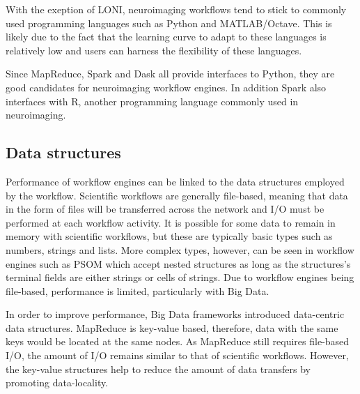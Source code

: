             With the exeption of LONI, neuroimaging workflows tend to stick to
            commonly used programming languages such as Python and MATLAB/Octave.
            This is likely due to the fact that the learning curve to adapt to
            these languages is relatively low and users can harness the 
            flexibility of these languages. 
            
            Since MapReduce, Spark and Dask all provide interfaces to Python,  
            they are good candidates for neuroimaging workflow engines. In addition
            Spark also interfaces with R, another programming language commonly
            used in neuroimaging.

            \subsection{Data structures}\label{ds}
                
                Performance of workflow engines can be linked to the data structures
                employed by the workflow. Scientific
                workflows are generally file-based, meaning that data in the 
                form of files will be 
                transferred across the network and I/O must be
                performed at each workflow activity. It is possible for some 
                data to remain in memory with scientific workflows, but these 
                are typically basic types such as numbers, strings and lists.
                More complex types, however, can be seen in workflow engines 
                such as PSOM which accept nested structures as long as the
                structures's terminal fields are either strings or cells of 
                strings. Due to workflow engines being file-based, performance
                is limited, particularly with Big Data.
                
                In order to improve performance, Big Data frameworks introduced
                data-centric data structures. MapReduce is key-value based, 
                therefore, data with the same keys would be located at the
                same nodes. As MapReduce still requires file-based I/O, the 
                amount of I/O remains similar to that of scientific workflows. 
                However, the key-value structures help to reduce the amount 
                of data transfers by promoting data-locality.

